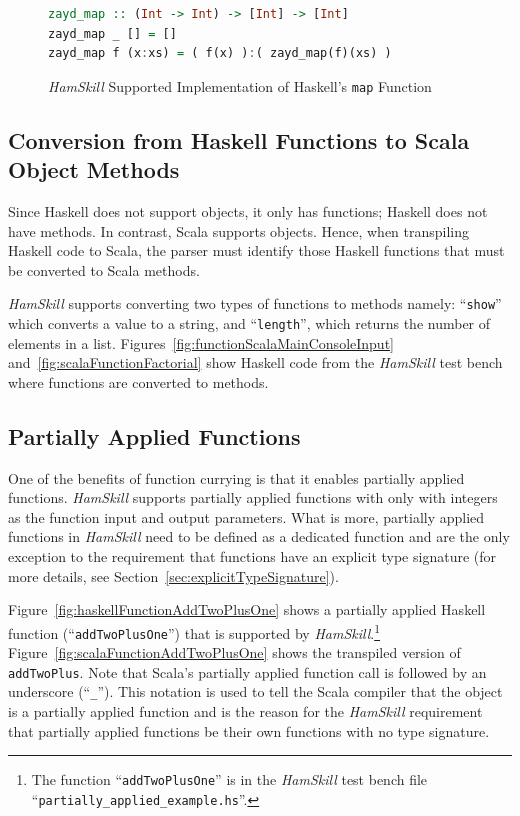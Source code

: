 \documentclass{report}
\begin{document}
\begin{figure}[H]
\begin{mdframed}
\begin{lstlisting}[language=Haskell]
zayd_map :: (Int -> Int) -> [Int] -> [Int]
zayd_map _ [] = []
zayd_map f (x:xs) = ( f(x) ):( zayd_map(f)(xs) )
\end{lstlisting}
\end{mdframed}
\caption{\textit{HamSkill} Supported Implementation of Haskell's \texttt{map} Function}\label{fig:haskellFunctionMap}
\end{figure}

\subsection{Conversion from Haskell Functions to Scala Object Methods}

Since Haskell does not support objects, it only has functions; Haskell does not have methods.  In contrast, Scala supports objects.  Hence, when transpiling Haskell code to Scala, the parser must identify those Haskell functions that must be converted to Scala methods.  

\textit{HamSkill} supports converting two types of functions to methods namely: ``\texttt{show}'' which converts a value to a string, and ``\texttt{length}'', which returns the number of elements in a list.  Figures~\ref{fig:functionScalaMainConsoleInput} and~\ref{fig:scalaFunctionFactorial} show Haskell code from the \textit{HamSkill} test bench where functions are converted to methods.

\subsection{Partially Applied Functions}\label{sec:partiallyAppliedFunctions}

One of the benefits of function currying is that it enables partially applied functions.  \textit{HamSkill} supports partially applied functions with only with integers as the function input and output parameters.  What is more, partially applied functions in \textit{HamSkill} need to be defined as a dedicated function and are the only exception to the requirement that functions have an explicit type signature (for more details, see Section~\ref{sec:explicitTypeSignature}).  

Figure~\ref{fig:haskellFunctionAddTwoPlusOne} shows a partially applied Haskell function (``\texttt{addTwoPlusOne}'') that is supported by \textit{HamSkill}.\footnote{The function ``\texttt{addTwoPlusOne}'' is in the \textit{HamSkill} test bench file ``\texttt{partially\_applied\_example.hs}''.}  Figure~\ref{fig:scalaFunctionAddTwoPlusOne} shows the transpiled version of \texttt{addTwoPlus}.  Note that Scala's partially applied function call is followed by an underscore (``\texttt{\_}'').  This notation is used to tell the Scala compiler that the object is a partially applied function and is the reason for the \textit{HamSkill} requirement that partially applied functions be their own functions with no type signature.
\end{document}
